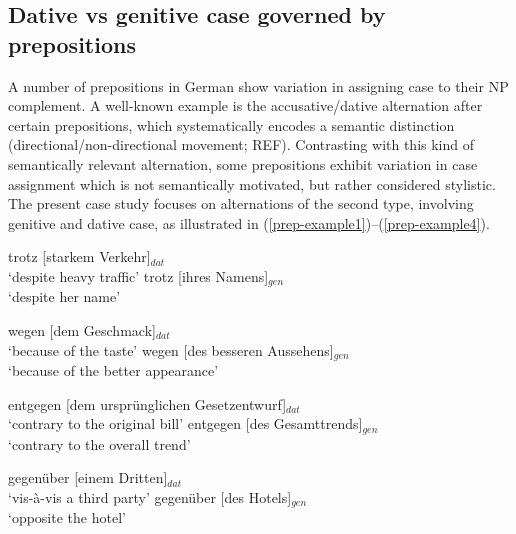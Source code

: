 
\subsection{Dative vs genitive case governed by prepositions}

A number of prepositions in German show variation in assigning  case to their NP complement.
A well-known example is the accusative/dative alternation after certain prepositions, which systematically encodes a semantic distinction (directional/non-directional movement; REF).
Contrasting with this kind of semantically relevant alternation, some prepositions exhibit variation in case assignment which is not semantically motivated, but rather considered stylistic.
The present case study focuses on alternations of the second type, involving genitive and dative case, as illustrated in (\ref{prep-example1})--(\ref{prep-example4}).

\begin{exe}
  \ex \label{prep-example1}
    \begin{xlist}
      \ex trotz [starkem Verkehr]$_{dat}$\\
          `despite heavy traffic'
      \ex trotz [ihres Namens]$_{gen}$\\ 
          `despite her name'
    \end{xlist}
  \ex
  \begin{xlist}
    \ex wegen [dem Geschmack]$_{dat}$\\
        `because of the taste'
    \ex wegen [des besseren Aussehens]$_{gen}$\\ 
        `because of the better appearance' 
  \end{xlist}
  \ex
    \begin{xlist}
      \ex entgegen [dem urspr\"unglichen Gesetzentwurf]$_{dat}$\\
          `contrary to the original bill' 
      \ex entgegen [des Gesamttrends]$_{gen}$\\ 
          `contrary to the overall trend'
  \end{xlist}
  \ex \label{prep-example4}
    \begin{xlist}
        \ex gegen\"uber [einem Dritten]$_{dat}$\\
            `vis-à-vis a third party'
        \ex gegen\"uber [des Hotels]$_{gen}$\\ 
            `opposite the hotel' 
    \end{xlist}  
\end{exe}


